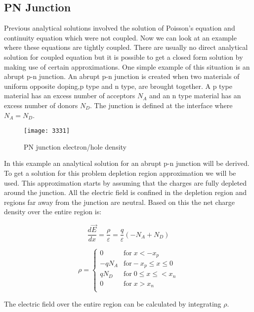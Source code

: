 \subsection{PN Junction}
Previous analytical solutions involved the solution of Poisson's equation and continuity equation which were not coupled. Now we can look at an example where these equations are tightly coupled. There are usually no direct analytical solution for coupled equation but it is possible to get a closed form solution by making use of certain approximations. One simple example of this situation is an abrupt p-n junction. An abrupt p-n junction is created when two materials of uniform opposite doping,p type and n type, are brought together. A p type material has an excess number of acceptors $N_A$ and an n type material has an excess number of donors $N_D$. The junction is defined at the interface where $N_A=N_D$. 

\begin{figure}[!htp]
\centering
\texttt{[image: 3331]}
\caption{PN junction electron/hole density} 
\end{figure}


In this example an analytical solution for an abrupt p-n junction will be derived. To get a solution for this problem depletion region approximation we will be used. This approximation starts by assuming that the charges are fully depleted around the junction. All the electric field is confined in the depletion region and regions far away from the junction are neutral. Based on this the net charge density over the entire region is:

\begin{equation}
\frac{d \vec{E} }{dx}=\frac{\rho}{\varepsilon}=\frac{q}{\varepsilon}(-N_{A}+N_{D})
\end{equation}

\begin{equation}
\rho = \begin{cases}
         0 & \text{for} \;  x<-x_{p}\\
       -qN_{A} & \text{for}  -x_{p}\leq x \leq 0 \\
        qN_{D} & \text{for} \; 0 \leq x \leq< x_{n}  \\
        0 & \text{for}\;  x>x_{n} \\
     \end{cases}
\end{equation}

The electric field over the entire region can be calculated by integrating $\rho$.

